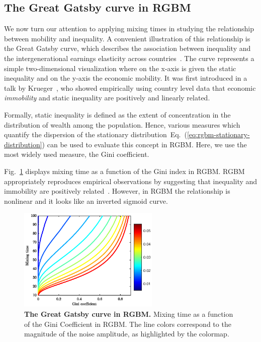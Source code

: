 \documentclass[11pt]{article}
\newcommand{\eref}[1]{Eq.~(\ref{eq:#1})}
\newcommand{\fref}[1]{Fig.~\ref{fig:#1}}
\newcommand{\be}{\begin{equation}}
\newcommand{\ee}{\end{equation}}
\numberwithin{equation}{section}
\begin{document}
\subsection{The Great Gatsby curve in RGBM}

We now turn our attention to applying mixing times in studying the relationship between mobility and inequality. A convenient illustration of this relationship is the Great Gatsby curve, which describes the association between inequality and the intergenerational earnings elasticity across countries~\citep{krueger2012rise,corak2013}. The curve represents a simple two-dimensional visualization where on the x-axis is given the static inequality and on the y-axis the economic mobility. It was first introduced in a talk by Krueger~\cite{krueger2012rise}, who showed empirically using country level data that economic \textit{immobility} and static inequality are  positively and linearly related.

Formally, static inequality is defined as the extent of concentration in the distribution of wealth among the population. Hence, various measures which quantify the dispersion of the stationary distribution~\eref{rgbm-stationary-distribution} can be used to evaluate this concept in RGBM. Here, we use the most widely used measure, the Gini coefficient.


\fref{rgbm-great-gatsby} displays mixing time as a function of the Gini index in RGBM. RGBM appropriately reproduces empirical observations by suggesting that inequality and immobility are positively related~\citep{krueger2012}. However, in RGBM the relationship is nonlinear and it looks like an inverted sigmoid curve.

\begin{figure}[!htb]
\centering
\includegraphics[width=0.6\textwidth]{figs/fig_great_gatsby.eps}
\caption{\textbf{The Great Gatsby curve in RGBM.} Mixing time as a function of the Gini Coefficient in RGBM. The line colors correspond to the magnitude of the noise amplitude, as highlighted by the colormap.
\label{fig:rgbm-great-gatsby}}
\end{figure}
\end{document}
